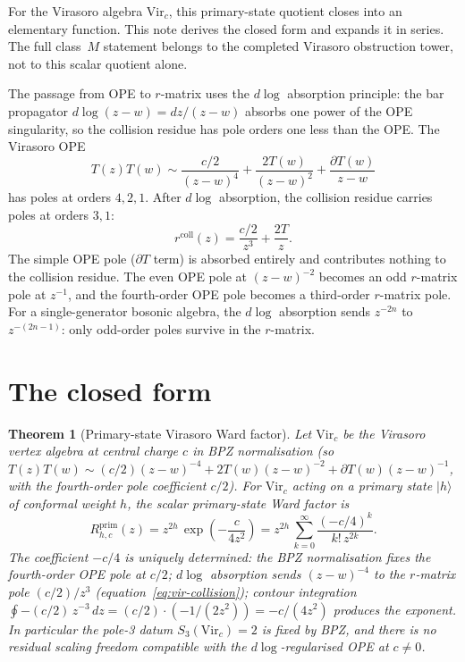 \documentclass[11pt]{article}
\newtheorem{theorem}{Theorem}[section]
\theoremstyle{definition}
\theoremstyle{remark}
\newcommand{\Vir}{\mathrm{Vir}}
\numberwithin{equation}{section}
\begin{document}
For the Virasoro algebra $\Vir_c$, this primary-state quotient closes
into an elementary function. This note derives the closed form and
expands it in series. The full class~$M$ statement belongs to the
completed Virasoro obstruction tower, not to this scalar quotient
alone.

The passage from OPE to $r$-matrix uses the $d\log$ absorption
principle: the bar propagator $d\log(z-w) = dz/(z-w)$ absorbs one
power of the OPE singularity, so the collision residue has pole orders
one less than the OPE. The Virasoro OPE
\begin{equation}\label{eq:vir-ope}
T(z)T(w) \sim \frac{c/2}{(z-w)^4} + \frac{2T(w)}{(z-w)^2}
+ \frac{\partial T(w)}{z-w}
\end{equation}
has poles at orders $4, 2, 1$. After $d\log$ absorption, the
collision residue carries poles at orders $3, 1$:
\begin{equation}\label{eq:vir-collision}
r^{\mathrm{coll}}(z) = \frac{c/2}{z^3} + \frac{2T}{z}.
\end{equation}
The simple OPE pole ($\partial T$ term) is absorbed entirely and
contributes nothing to the collision residue. The even OPE pole at
$(z-w)^{-2}$ becomes an odd $r$-matrix pole at $z^{-1}$, and the
fourth-order OPE pole becomes a third-order $r$-matrix pole. For a
single-generator bosonic algebra, the $d\log$ absorption sends
$z^{-2n}$ to $z^{-(2n-1)}$: only odd-order poles survive in the
$r$-matrix.

\section{The closed form}\label{sec:closed-form}

\begin{theorem}[Primary-state Virasoro Ward factor]
\label{thm:vir-R}
Let $\Vir_c$ be the Virasoro vertex algebra at central charge $c$
in BPZ normalisation (so $T(z)T(w) \sim (c/2)(z-w)^{-4} + 2T(w)(z-w)^{-2}
+ \partial T(w)(z-w)^{-1}$, with the fourth-order pole coefficient
$c/2$). For $\Vir_c$ acting on a primary state $|h\rangle$ of
conformal weight $h$, the scalar primary-state Ward factor is
\begin{equation}\label{eq:vir-R-closed}
R^{\mathrm{prim}}_{h,c}(z)
= z^{2h}\,\exp\!\left(-\frac{c}{4z^2}\right)
= z^{2h}\,\sum_{k=0}^{\infty}
\frac{(-c/4)^k}{k!\,z^{2k}}.
\end{equation}
The coefficient $-c/4$ is uniquely determined: the BPZ
normalisation fixes the fourth-order OPE pole at $c/2$; $d\log$
absorption sends $(z-w)^{-4}$ to the $r$-matrix pole $(c/2)/z^3$
(equation~\eqref{eq:vir-collision}); contour integration
$\oint -(c/2)\,z^{-3}\,dz = (c/2)\cdot(-1/(2z^2)) = -c/(4z^2)$
produces the exponent. In particular the pole-3 datum $S_3(\Vir_c)
= 2$ is fixed by BPZ, and there is no residual scaling freedom
compatible with the $d\log$-regularised OPE at $c \neq 0$.
\end{theorem}
\end{document}
